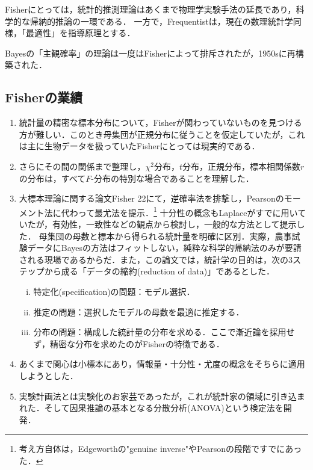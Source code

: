 \documentclass[uplatex,dvipdfmx]{jsreport}
\begin{document}
\begin{discussion}
    Fisherにとっては，統計的推測理論はあくまで物理学実験手法の延長であり，科学的な帰納的推論の一環である．
    一方で，Frequentistは，現在の数理統計学同様，「最適性」を指導原理とする．
\end{discussion}

\begin{discussion}
    Bayesの「主観確率」の理論は一度はFisherによって排斥されたが，1950sに再構築された．
\end{discussion}

\subsection{Fisherの業績}

\begin{enumerate}
    \item 統計量の精密な標本分布について，Fisherが関わっていないものを見つける方が難しい．このとき母集団が正規分布に従うことを仮定していたが，これは主に生物データを扱っていたFisherにとっては現実的である．
    \item さらにその間の関係まで整理し，$\chi^2$分布，$t$分布，正規分布，標本相関係数$r$の分布は，すべて$F$-分布の特別な場合であることを理解した．
    \item 大標本理論に関する論文Fisher 22\cite{Fisher22}にて，逆確率法を排撃し，Pearsonのモーメント法に代わって最尤法を提示．\footnote{考え方自体は，Edgeworthの"genuine inverse"やPearsonの段階ですでにあった．}
    十分性の概念もLaplaceがすでに用いていたが，有効性，一致性などの観点から検討し，一般的な方法として提示した．
    母集団の母数と標本から得られる統計量を明確に区別．実際，農事試験データにBayesの方法はフィットしない，純粋な科学的帰納法のみが要請される現場であるからだ．また，この論文では，統計学の目的は，次の3ステップから成る「データの縮約(reduction of data)」であるとした．
    \begin{enumerate}[(i)]
        \item 特定化(specification)の問題：モデル選択．
        \item 推定の問題：選択したモデルの母数を最適に推定する．
        \item 分布の問題：構成した統計量の分布を求める．ここで漸近論を採用せず，精密な分布を求めたのがFisherの特徴である．
    \end{enumerate}
    \item あくまで関心は小標本にあり，情報量・十分性・尤度の概念をそちらに適用しようとした．
    \item 実験計画法とは実験化のお家芸であったが，これが統計家の領域に引き込まれた．そして因果推論の基本となる分散分析(ANOVA)という検定法を開発．
\end{enumerate}
\end{document}
